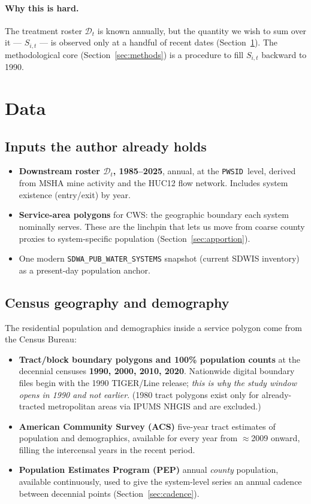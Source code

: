 \documentclass[11pt]{article}
\newcommand{\PWSID}{\texttt{PWSID}}
\newcommand{\popserved}{\ensuremath{S}}
\begin{document}
\paragraph{Why this is hard.}
The treatment roster $\mathcal{D}_t$ is known annually, but the quantity we wish to
sum over it --- $\popserved_{i,t}$ --- is observed only at a handful of recent dates
(Section~\ref{sec:data}). The methodological core (Section~\ref{sec:methods}) is a
procedure to fill $\popserved_{i,t}$ backward to 1990.

\section{Data}
\label{sec:data}

\subsection{Inputs the author already holds}
\begin{itemize}[leftmargin=2em]
  \item \textbf{Downstream roster $\mathcal{D}_t$, 1985--2025}, annual, at the
    \PWSID\ level, derived from MSHA mine activity and the HUC12 flow network. Includes
    system existence (entry/exit) by year.
  \item \textbf{Service-area polygons} for CWS: the geographic boundary each system
    nominally serves. These are the linchpin that lets us move from coarse county
    proxies to system-specific population (Section~\ref{sec:apportion}).
  \item One modern \texttt{SDWA\_PUB\_WATER\_SYSTEMS} snapshot (current SDWIS
    inventory) as a present-day population anchor.
\end{itemize}

\subsection{Census geography and demography}
The residential population and demographics inside a service polygon come from the
Census Bureau:
\begin{itemize}[leftmargin=2em]
  \item \textbf{Tract/block boundary polygons and 100\% population counts} at the
    decennial censuses \textbf{1990, 2000, 2010, 2020}. Nationwide digital boundary
    files begin with the 1990 TIGER/Line release; \emph{this is why the study window
    opens in 1990 and not earlier}. (1980 tract polygons exist only for already-tracted
    metropolitan areas via IPUMS NHGIS and are excluded.)
  \item \textbf{American Community Survey (ACS)} five-year tract estimates of
    population and demographics, available for every year from $\approx$2009 onward,
    filling the intercensal years in the recent period.
  \item \textbf{Population Estimates Program (PEP)} annual \emph{county} population,
    available continuously, used to give the system-level series an annual cadence
    between decennial points (Section~\ref{sec:cadence}).
\end{itemize}
\end{document}
